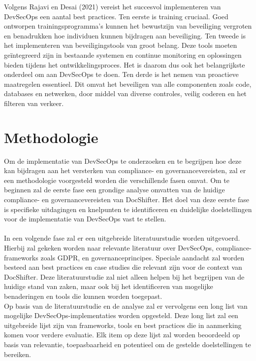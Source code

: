 \documentclass{hogent-article}
\begin{document}
   Volgens Rajavi en Desai (2021) vereist het succesvol implementeren van DevSecOps een aantal best practices. Ten eerste is training cruciaal. Goed ontworpen trainingsprogramma's kunnen het bewustzijn van beveiliging vergroten en benadrukken hoe individuen kunnen bijdragen aan beveiliging. Ten tweede is het implementeren van beveiligingstools van groot belang. Deze tools moeten geïntegreerd zijn in bestaande systemen en continue monitoring en oplossingen bieden tijdens het ontwikkelingsproces. Het is daarom dus ook het belangrijkste onderdeel om aan DevSecOps te doen. Ten derde is het nemen van proactieve maatregelen essentieel. Dit omvat het beveiligen van alle componenten zoals code, databases en netwerken, door middel van diverse controles, veilig coderen en het filteren van verkeer. \autocite{RajaviDesai2021}
    
    \section{Methodologie}%
    \label{sec:methodologie}
    
    Om de implementatie van DevSecOps te onderzoeken en te begrijpen hoe deze kan bijdragen aan het versterken van compliance- en governancevereisten, zal er een methodologie voorgesteld worden die verschillende fasen omvat. Om te beginnen zal de eerste fase een grondige analyse omvatten van de huidige compliance- en governancevereisten van DocShifter. Het doel van deze eerste fase is specifieke uitdagingen en knelpunten te identificeren en duidelijke doelstellingen voor de implementatie van DevSecOps vast te stellen.
    \\
    \\
    
    \noindent In een volgende fase zal er een uitgebreide literatuurstudie worden uitgevoerd. Hierbij zal gekeken worden naar relevante literatuur over DevSecOps, compliance-frameworks zoals GDPR, en governanceprincipes. Speciale aandacht zal worden besteed aan best practices en case studies die relevant zijn voor de context van DocShifter. Deze literatuurstudie zal niet alleen helpen bij het begrijpen van de huidige stand van zaken, maar ook bij het identificeren van mogelijke benaderingen en tools die kunnen worden toegepast.\\
    
    \noindent Op basis van de literatuurstudie en de analyse zal er vervolgens een long list van mogelijke DevSecOps-implementaties worden opgesteld. Deze long list zal een uitgebreide lijst zijn van frameworks, tools en best practices die in aanmerking komen voor verdere evaluatie. Elk item op deze lijst zal worden beoordeeld op basis van relevantie, toepasbaarheid en potentieel om de gestelde doelstellingen te bereiken.\\
    
\end{document}
